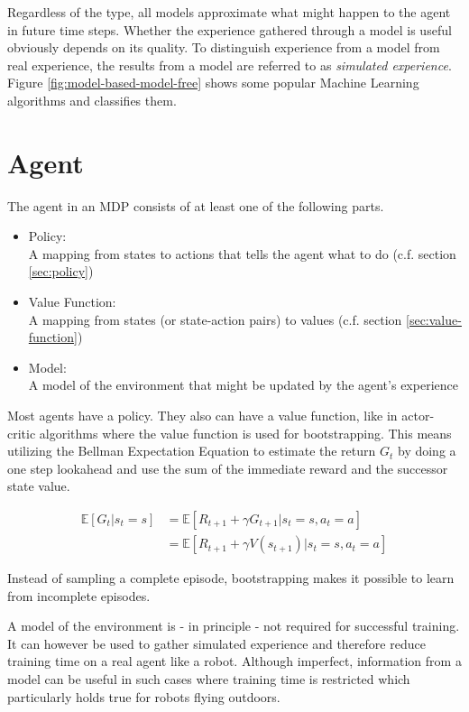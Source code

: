 Regardless of the type, all models approximate what might happen to the agent in future time steps. Whether the experience gathered through a model is useful obviously depends on its quality. To distinguish experience from a model from real experience, the results from a model are referred to as \textit{simulated experience}\cite{SuttonBarto2018}. Figure \ref{fig:model-based-model-free} shows some popular Machine Learning algorithms and classifies them.

\section{Agent}

The agent in an MDP consists of at least one of the following parts.

\begin{itemize}
	\item Policy: \\
	A mapping from states to actions that tells the agent what to do (c.f. section \ref{sec:policy})
	\item Value Function: \\
	A mapping from states (or state-action pairs) to values (c.f. section \ref{sec:value-function})
	\item Model: \\
	A model of the environment that might be updated by the agent's experience
\end{itemize}

Most agents have a policy. They also can have a value function, like in actor-critic algorithms where the value function is used for bootstrapping. This means utilizing the Bellman Expectation Equation to estimate the return $G_t$ by doing a one step lookahead and use the sum of the immediate reward and the successor state value.

\begin{align}
\mathbb{E}[G_t|s_t=s] &= \mathbb{E}[R_{t+1} + \gamma G_{t+1}|s_t=s, a_t=a] \\
&=\mathbb{E}[R_{t+1}+ \gamma V(s_{t+1})|s_t=s, a_t=a]
\end{align}

Instead of sampling a complete episode, bootstrapping makes it possible to learn from incomplete episodes.

A model of the environment is - in principle - not required for successful training. It can however be used to gather simulated experience and therefore reduce training time on a real agent like a robot. Although imperfect, information from a model can be useful in such cases where training time is restricted which particularly holds true for robots flying outdoors.

